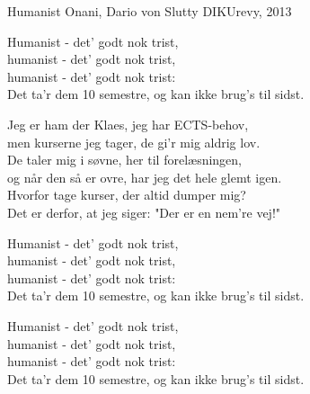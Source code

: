 \begin{song}{Humanist}
  {} %
  {Onani, Dario von Slutty} %
  {} %
  {DIKUrevy, 2013} %
  {\NotCCLIed} %

  \begin{SBChorus}
    Humanist - det' godt nok trist,\\
    humanist - det' godt nok trist,\\
    humanist - det' godt nok trist:\\
    Det ta'r dem 10 semestre, og kan ikke brug's til sidst.
  \end{SBChorus}

  \begin{SBVerse}
    Jeg er ham der Klaes, jeg har ECTS-behov,\\
    men kurserne jeg tager, de gi'r mig aldrig lov.\\
    De taler mig i søvne, her til forelæsningen,\\
    og når den så er ovre, har jeg det hele glemt igen.\\
    Hvorfor tage kurser, der altid dumper mig?\\
    Det er derfor, at jeg siger: "Der er en nem're vej!"
  \end{SBVerse}

  \begin{SBChorus}
    Humanist - det' godt nok trist,\\
    humanist - det' godt nok trist,\\
    humanist - det' godt nok trist:\\
    Det ta'r dem 10 semestre, og kan ikke brug's til sidst.
  \end{SBChorus}

  \begin{SBChorus}
    Humanist - det' godt nok trist,\\
    humanist - det' godt nok trist,\\
    humanist - det' godt nok trist:\\
    Det ta'r dem 10 semestre, og kan ikke brug's til sidst.
  \end{SBChorus}



\end{song}
